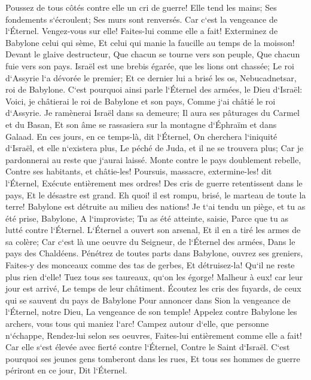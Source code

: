 \verse Poussez de tous côtés contre elle un cri de guerre! Elle tend les mains; Ses fondements s`écroulent; Ses murs sont renversés. Car c`est la vengeance de l`Éternel. Vengez-vous sur elle! Faites-lui comme elle a fait! 
\verse Exterminez de Babylone celui qui sème, Et celui qui manie la faucille au temps de la moisson! Devant le glaive destructeur, Que chacun se tourne vers son peuple, Que chacun fuie vers son pays. 
\verse Israël est une brebis égarée, que les lions ont chassée; Le roi d`Assyrie l`a dévorée le premier; Et ce dernier lui a brisé les os, Nebucadnetsar, roi de Babylone. 
\verse C`est pourquoi ainsi parle l`Éternel des armées, le Dieu d`Israël: Voici, je châtierai le roi de Babylone et son pays, Comme j`ai châtié le roi d`Assyrie. 
\verse Je ramènerai Israël dans sa demeure; Il aura ses pâturages du Carmel et du Basan, Et son âme se rassasiera sur la montagne d`Éphraïm et dans Galaad. 
\verse En ces jours, en ce temps-là, dit l`Éternel, On cherchera l`iniquité d`Israël, et elle n`existera plus, Le péché de Juda, et il ne se trouvera plus; Car je pardonnerai au reste que j`aurai laissé. 
\verse Monte contre le pays doublement rebelle, Contre ses habitants, et châtie-les! Poursuis, massacre, extermine-les! dit l`Éternel, Exécute entièrement mes ordres! 
\verse Des cris de guerre retentissent dans le pays, Et le désastre est grand. 
\verse Eh quoi! il est rompu, brisé, le marteau de toute la terre! Babylone est détruite au milieu des nations! 
\verse Je t`ai tendu un piège, et tu as été prise, Babylone, A l`improviste; Tu as été atteinte, saisie, Parce que tu as lutté contre l`Éternel. 
\verse L`Éternel a ouvert son arsenal, Et il en a tiré les armes de sa colère; Car c`est là une oeuvre du Seigneur, de l`Éternel des armées, Dans le pays des Chaldéens. 
\verse Pénétrez de toutes parts dans Babylone, ouvrez ses greniers, Faites-y des monceaux comme des tas de gerbes, Et détruisez-la! Qu`il ne reste plus rien d`elle! 
\verse Tuez tous ses taureaux, qu`on les égorge! Malheur à eux! car leur jour est arrivé, Le temps de leur châtiment. 
\verse Écoutez les cris des fuyards, de ceux qui se sauvent du pays de Babylone Pour annoncer dans Sion la vengeance de l`Éternel, notre Dieu, La vengeance de son temple! 
\verse Appelez contre Babylone les archers, vous tous qui maniez l`arc! Campez autour d`elle, que personne n`échappe, Rendez-lui selon ses oeuvres, Faites-lui entièrement comme elle a fait! Car elle s`est élevée avec fierté contre l`Éternel, Contre le Saint d`Israël. 
\verse C`est pourquoi ses jeunes gens tomberont dans les rues, Et tous ses hommes de guerre périront en ce jour, Dit l`Éternel. 
